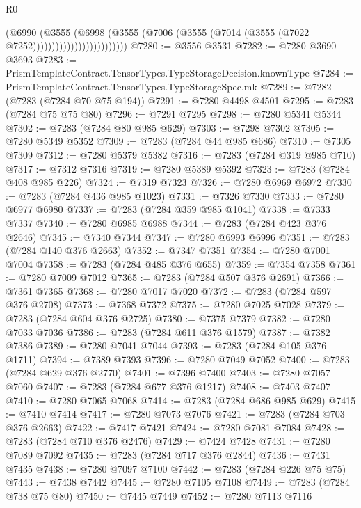 \begin{lexlean}{R0}
\begin{coremodule}
                                    (@6990
                                      (@3555
                                        (@6998
                                          (@3555
                                            (@7006
                                              (@3555
                                                (@7014 (@3555 (@7022 @7252)))))))))))))))))))))))))
@7280 := @3556 @3531
@7282 := @7280 @3690 @3693
@7283 := PrismTemplateContract.TensorTypes.TypeStorageDecision.knownType
@7284 := PrismTemplateContract.TensorTypes.TypeStorageSpec.mk
@7289 := @7282 (@7283 (@7284 @70 @75 @194))
@7291 := @7280 @4498 @4501
@7295 := @7283 (@7284 @75 @75 @80)
@7296 := @7291 @7295
@7298 := @7280 @5341 @5344
@7302 := @7283 (@7284 @80 @985 @629)
@7303 := @7298 @7302
@7305 := @7280 @5349 @5352
@7309 := @7283 (@7284 @44 @985 @686)
@7310 := @7305 @7309
@7312 := @7280 @5379 @5382
@7316 := @7283 (@7284 @319 @985 @710)
@7317 := @7312 @7316
@7319 := @7280 @5389 @5392
@7323 := @7283 (@7284 @408 @985 @226)
@7324 := @7319 @7323
@7326 := @7280 @6969 @6972
@7330 := @7283 (@7284 @436 @985 @1023)
@7331 := @7326 @7330
@7333 := @7280 @6977 @6980
@7337 := @7283 (@7284 @359 @985 @1041)
@7338 := @7333 @7337
@7340 := @7280 @6985 @6988
@7344 := @7283 (@7284 @423 @376 @2646)
@7345 := @7340 @7344
@7347 := @7280 @6993 @6996
@7351 := @7283 (@7284 @140 @376 @2663)
@7352 := @7347 @7351
@7354 := @7280 @7001 @7004
@7358 := @7283 (@7284 @485 @376 @655)
@7359 := @7354 @7358
@7361 := @7280 @7009 @7012
@7365 := @7283 (@7284 @507 @376 @2691)
@7366 := @7361 @7365
@7368 := @7280 @7017 @7020
@7372 := @7283 (@7284 @597 @376 @2708)
@7373 := @7368 @7372
@7375 := @7280 @7025 @7028
@7379 := @7283 (@7284 @604 @376 @2725)
@7380 := @7375 @7379
@7382 := @7280 @7033 @7036
@7386 := @7283 (@7284 @611 @376 @1579)
@7387 := @7382 @7386
@7389 := @7280 @7041 @7044
@7393 := @7283 (@7284 @105 @376 @1711)
@7394 := @7389 @7393
@7396 := @7280 @7049 @7052
@7400 := @7283 (@7284 @629 @376 @2770)
@7401 := @7396 @7400
@7403 := @7280 @7057 @7060
@7407 := @7283 (@7284 @677 @376 @1217)
@7408 := @7403 @7407
@7410 := @7280 @7065 @7068
@7414 := @7283 (@7284 @686 @985 @629)
@7415 := @7410 @7414
@7417 := @7280 @7073 @7076
@7421 := @7283 (@7284 @703 @376 @2663)
@7422 := @7417 @7421
@7424 := @7280 @7081 @7084
@7428 := @7283 (@7284 @710 @376 @2476)
@7429 := @7424 @7428
@7431 := @7280 @7089 @7092
@7435 := @7283 (@7284 @717 @376 @2844)
@7436 := @7431 @7435
@7438 := @7280 @7097 @7100
@7442 := @7283 (@7284 @226 @75 @75)
@7443 := @7438 @7442
@7445 := @7280 @7105 @7108
@7449 := @7283 (@7284 @738 @75 @80)
@7450 := @7445 @7449
@7452 := @7280 @7113 @7116

\end{coremodule}
\end{lexlean}

